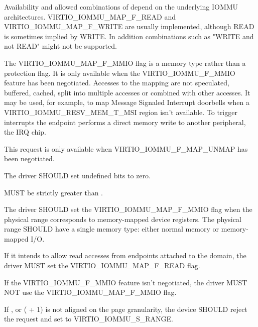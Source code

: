Availability and allowed combinations of  depend on the
underlying IOMMU architectures. VIRTIO_IOMMU_MAP_F_READ and
VIRTIO_IOMMU_MAP_F_WRITE are usually implemented, although READ is
sometimes implied by WRITE. In addition combinations such as "WRITE and
not READ" might not be supported.

The VIRTIO_IOMMU_MAP_F_MMIO flag is a memory type rather than a protection
flag. It is only available when the VIRTIO_IOMMU_F_MMIO feature has been
negotiated. Accesses to the mapping are not speculated, buffered, cached,
split into multiple accesses or combined with other accesses. It may be
used, for example, to map Message Signaled Interrupt doorbells when a
VIRTIO_IOMMU_RESV_MEM_T_MSI region isn't available. To trigger interrupts
the endpoint performs a direct memory write to another peripheral, the IRQ
chip.

This request is only available when VIRTIO_IOMMU_F_MAP_UNMAP has been
negotiated.


The driver SHOULD set undefined  bits to zero.

 MUST be strictly greater than .

The driver SHOULD set the VIRTIO_IOMMU_MAP_F_MMIO flag when the physical
range corresponds to memory-mapped device registers. The physical range
SHOULD have a single memory type: either normal memory or memory-mapped
I/O.

If it intends to allow read accesses from endpoints attached to
the domain, the driver MUST set the VIRTIO_IOMMU_MAP_F_READ flag.

If the VIRTIO_IOMMU_F_MMIO feature isn't negotiated, the driver MUST NOT
use the VIRTIO_IOMMU_MAP_F_MMIO flag.


If ,  or ( + 1) is
not aligned on the page granularity, the device SHOULD reject the request
and set  to VIRTIO_IOMMU_S_RANGE.

